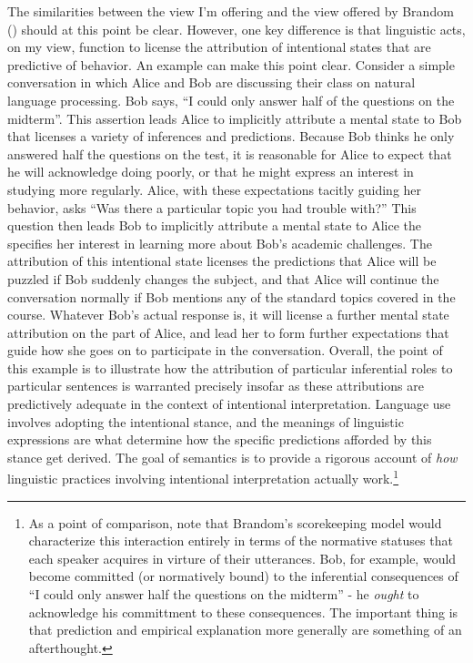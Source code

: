 The similarities between the view I'm offering and the view offered by Brandom (\citeyear{Brandom:1994}) should at this point be clear. However, one key difference is that linguistic acts, on my view, function to license the attribution of intentional states that are predictive of behavior. An example can make this point clear. Consider a simple conversation in which Alice and Bob are discussing their class on natural language processing. Bob says, ``I could only answer half of the questions on the midterm''. This assertion leads Alice to implicitly attribute a mental state to Bob that licenses a variety of inferences and predictions. Because Bob thinks he only answered half the questions on the test, it is reasonable for Alice to expect that he will acknowledge doing poorly, or that he might express an interest in studying more regularly. Alice, with these expectations tacitly guiding her behavior, asks ``Was there a particular topic you had trouble with?'' This question then leads Bob to implicitly attribute a mental state to Alice the specifies her interest in learning more about Bob's academic challenges. The attribution of this intentional state licenses the predictions that Alice will be puzzled if Bob suddenly changes the subject, and that Alice will continue the conversation normally if Bob mentions any of the standard topics covered in the course. Whatever Bob's actual response is, it will license a further mental state attribution on the part of Alice, and lead her to form further expectations that guide how she goes on to participate in the conversation. Overall, the point of this example is to illustrate how the attribution of particular inferential roles to particular sentences is warranted precisely insofar as these attributions are predictively adequate in the context of intentional interpretation. Language use involves adopting the intentional stance, and the meanings of linguistic expressions are what determine how the specific predictions afforded by this stance get derived. The goal of semantics is to provide a rigorous account of \textit{how} linguistic practices involving intentional interpretation actually work.\footnote{As a point of comparison, note that Brandom's scorekeeping model would characterize this interaction entirely in terms of the normative statuses that each speaker acquires in virture of their utterances. Bob, for example, would become committed (or normatively bound) to the inferential consequences of ``I could only answer half the questions on the midterm'' - he \textit{ought} to acknowledge his committment to these consequences. The important thing is that prediction and empirical explanation more generally are something of an afterthought.} 

